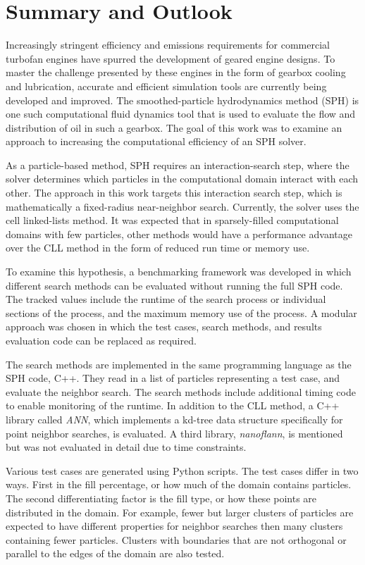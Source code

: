 
\chapter{Summary and Outlook}


Increasingly stringent efficiency and emissions requirements for commercial turbofan engines have spurred the development of geared engine designs. To master the challenge presented by these engines in the form of gearbox cooling and lubrication, accurate and efficient simulation tools are currently being developed and improved. The smoothed-particle hydrodynamics method (SPH) is one such computational fluid dynamics tool that is used to evaluate the flow and distribution of oil in such a gearbox. The goal of this work was to examine an approach to increasing the computational efficiency of an SPH solver.

As a particle-based method, SPH requires an interaction-search step, where the solver determines which particles in the computational domain interact with each other. The approach in this work targets this interaction search step, which is mathematically a fixed-radius near-neighbor search. Currently, the solver uses the cell linked-lists method. It was expected that in sparsely-filled computational domains with few particles, other methods would have a performance advantage over the CLL method in the form of reduced run time or memory use.

To examine this hypothesis, a benchmarking framework was developed in which different search methods can be evaluated without running the full SPH code. The tracked values include the runtime of the search process or individual sections of the process, and the maximum memory use of the process. A modular approach was chosen in which the test cases, search methods, and results evaluation code can be replaced as required. 

The search methods are implemented in the same programming language as the SPH code, C++. They read in a list of particles representing a test case, and evaluate the neighbor search. The search methods include additional timing code to enable monitoring of the runtime. In addition to the CLL method, a C++ library called {\itshape ANN}, which implements a kd-tree data structure specifically for point neighbor searches, is evaluated. A third library, {\itshape nanoflann}, is mentioned but was not evaluated in detail due to time constraints.

Various test cases are generated using Python scripts. The test cases differ in two ways. First in the fill percentage, or how much of the domain contains particles. The second differentiating factor is the fill type, or how these points are distributed in the domain. For example, fewer but larger clusters of particles are expected to have different properties for neighbor searches then many clusters containing fewer particles. Clusters with boundaries that are not orthogonal or parallel to the edges of the domain are also tested.

